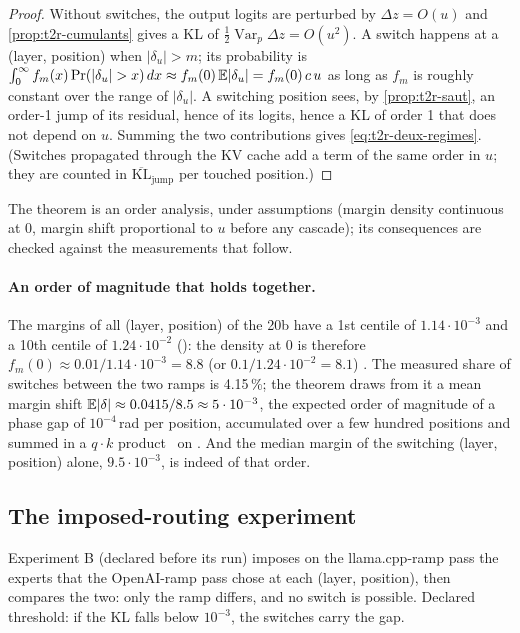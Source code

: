 \begin{proof}
Without switches, the output logits are perturbed by $\Delta z = O(u)$ and \cref{prop:t2r-cumulants} gives a KL of $\tfrac12\operatorname{Var}_p\Delta z = O(u^2)$. A switch happens at a (layer, position) when $|\delta_u| > m$; its probability is $\int_0^\infty f_m(x)\Pr(|\delta_u| > x)\,dx \approx f_m(0)\,\mathbb{E}|\delta_u| = f_m(0)\,c\,u$ as long as $f_m$ is roughly constant over the range of $|\delta_u|$. A switching position sees, by \cref{prop:t2r-saut}, an order-1 jump of its residual, hence of its logits, hence a KL of order 1 that does not depend on $u$. Summing the two contributions gives \eqref{eq:t2r-deux-regimes}. (Switches propagated through the KV cache add a term of the same order in $u$; they are counted in $\overline{\mathrm{KL}}_{\text{jump}}$ per touched position.)
\end{proof}

The theorem is an order analysis, under assumptions (margin density continuous at 0, margin shift proportional to $u$ before any cascade); its consequences are checked against the measurements that follow.

\paragraph{An order of magnitude that holds together.} The margins of all (layer, position) of the 20b have a 1st centile of $1.14\cdot10^{-3}$ and a 10th centile of $1.24\cdot10^{-2}$ (): the density at 0 is therefore $f_m(0) \approx 0.01/1.14\cdot10^{-3} = 8.8$ (or $0.1/1.24\cdot10^{-2} = 8.1$) \calc. The measured share of switches between the two ramps is 4.15\,\%; the theorem draws from it a mean margin shift $\mathbb{E}|\delta| \approx 0.0415/8.5 \approx 5\cdot10^{-3}$, the expected order of magnitude of a phase gap of $10^{-4}$\,rad per position, accumulated over a few hundred positions and summed in a $q\cdot k$ product \calc~on \mes. And the median margin of the switching (layer, position) alone, $9.5\cdot10^{-3}$, is indeed of that order.

\subsection{The imposed-routing experiment}\label{sec:t2r-impose}

Experiment B (declared before its run) imposes on the llama.cpp-ramp pass the experts that the OpenAI-ramp pass chose at each (layer, position), then compares the two: only the ramp differs, and no switch is possible. Declared threshold: if the KL falls below $10^{-3}$, the switches carry the gap.

